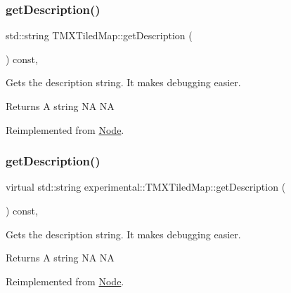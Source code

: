 \subsubsection{\texorpdfstring{get\+Description()}{getDescription()}\hspace{0.1cm}{\footnotesize\ttfamily [1/2]}}
{\footnotesize\ttfamily std\+::string T\+M\+X\+Tiled\+Map\+::get\+Description (\begin{DoxyParamCaption}{ }\end{DoxyParamCaption}) const\hspace{0.3cm}{\ttfamily [override]}, {\ttfamily [virtual]}}

Gets the description string. It makes debugging easier. \begin{DoxyReturn}{Returns}
A string  NA  NA 
\end{DoxyReturn}


Reimplemented from \hyperlink{classNode_a41710375a0d92a4ee54c39fe123b5912}{Node}.

\mbox{\label{classexperimental_1_1TMXTiledMap_ad9a07d8d562a0c138d903dca0f82e2f1}} 
\subsubsection{\texorpdfstring{get\+Description()}{getDescription()}\hspace{0.1cm}{\footnotesize\ttfamily [2/2]}}
{\footnotesize\ttfamily virtual std\+::string experimental\+::\+T\+M\+X\+Tiled\+Map\+::get\+Description (\begin{DoxyParamCaption}{ }\end{DoxyParamCaption}) const\hspace{0.3cm}{\ttfamily [override]}, {\ttfamily [virtual]}}

Gets the description string. It makes debugging easier. \begin{DoxyReturn}{Returns}
A string  NA  NA 
\end{DoxyReturn}


Reimplemented from \hyperlink{classNode_a41710375a0d92a4ee54c39fe123b5912}{Node}.

\mbox{\label{classexperimental_1_1TMXTiledMap_aff957f2716dd1f06bd8ce54b173c43e1}} 
